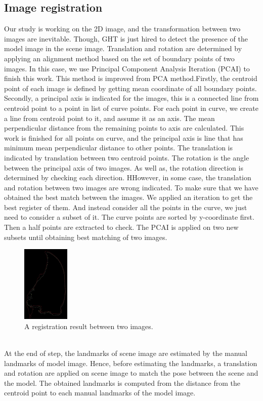 \documentclass[twoside,twocolumn,10pt]{article}
\begin{document}
\subsection{Image registration}
Our study is working on the 2D image, and the transformation between
two images are inevitable. Though, GHT is just hired to detect the
presence of the model image in the scene image. Translation and
rotation are determined by applying an alignment method based on the
set of boundary points of two images. In this case, we use Principal
Component Analysis Iteration (PCAI) to finish this work. This method
is improved from PCA method\cite{pca}.Firstly, the centroid point of
each image is defined by getting mean coordinate of all boundary
points. Secondly, a principal axis is indicated for the images, this
is a connected line from centroid point to a point in list of curve
points. For each point in curve, we create a line from centroid point
to it, and assume it as an axis. The mean perpendicular distance from
the remaining points to axis are calculated. This work is finished for
all points on curve, and the principal axis is line that has minimum
mean perpendicular distance to other points. The translation is
indicated by translation between two centroid points. The rotation is
the angle between the principal axis of two images. As well as, the
rotation direction is determined by checking each direction. HHowever,
in some case, the translation and rotation between two images are
wrong indicated. To make sure that we have obtained the best match
between the images. We applied an iteration to get the best register
of them. And instead consider all the points in the curve, we just
need to consider a subset of it. The curve points are sorted by
y-coordinate first. Then a half points are extracted to check. The
PCAI is applied on two new subsets until obtaining best matching of
two images.

\begin{figure}[htb]
    \centering
    \includegraphics[width=0.2\textwidth]{./images/imreg}
    \caption{A registration result between two images.}
    \label{fig:box}
\end{figure}~\\
At the end of step, the landmarks of scene image are estimated by the
manual landmarks of model image. Hence, before estimating the
landmarks, a translation and rotation are applied on scene image to
match the pose between the scene and the model. The obtained landmarks
is computed from the distance from the centroid point to each manual
landmarks of the model image.
\end{document}
